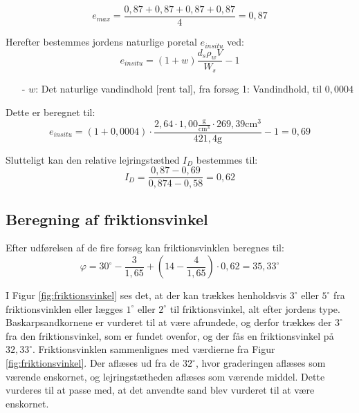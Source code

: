 \begin{equation}
	e_{max} = \frac{0,\!87 + 0,\!87 + 0,\!87 + 0,\!87}{4} = 0,\!87
\end{equation}

Herefter bestemmes jordens naturlige poretal $e_{in situ}$ ved:
\begin{equation}
	e_{in situ} = (1 + w) \frac{d_s  \rho_w  V}{W_s} - 1
\end{equation}

\begin{itemize}
	\item[-] $w$: Det naturlige vandindhold [rent tal], fra forsøg 1: Vandindhold, til $0,\!0004$ 
\end{itemize}

Dette er beregnet til:
\begin{equation}
	e_{in situ} = (1+0,\!0004) \cdot \frac{2,\!64 \cdot 1,\!00 \frac{\text{g}}{\text{cm}^3} \cdot 269,\!39 \text{cm}^3}{421,\!4 \text{g}} - 1 = 0,\!69
\end{equation}

Slutteligt kan den relative lejringstæthed $I_D$ bestemmes til:
\begin{equation}
	I_D = \frac{0,\!87 - 0,\!69}{0,\!874 - 0,\!58} = 0,\!62
\end{equation}

\subsection{Beregning af friktionsvinkel}
Efter udførelsen af de fire forsøg kan friktionsvinklen beregnes til:
\begin{equation}
	\varphi = 30^\circ - \frac{3}{1,\!65} + (14 - \frac{4}{1,\!65}) \cdot 0,\!62 = 35,\!33^\circ
\end{equation}

I Figur \ref{fig:friktionsvinkel} ses det, at der kan trækkes henholdsvis $3^{\circ}$ eller $5^{\circ}$ fra friktionsvinklen eller lægges $1^{\circ}$ eller $2^{\circ}$ til friktionsvinkel, alt efter jordens type. Baskarpsandkornene er vurderet til at være afrundede, og derfor trækkes der $3^{\circ}$ fra den friktionsvinkel, som er fundet ovenfor, og der fås en friktionsvinkel på $32,\!33^\circ$. 
\newline
\newline
Friktionsvinklen sammenlignes med værdierne fra Figur \ref{fig:friktionsvinkel}. Der aflæses ud fra de $32^{\circ}$, hvor graderingen aflæses som værende enskornet, og lejringstætheden aflæses som værende middel. Dette vurderes til at passe med, at det anvendte sand blev vurderet til at være enskornet.

